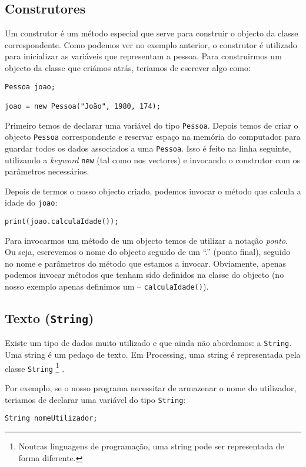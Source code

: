 \subsection{Construtores}
Um construtor é um método especial que serve para construir o objecto da classe correspondente. Como podemos ver no exemplo anterior, o construtor é utilizado para inicializar as variáveis que representam a pessoa.
Para construirmos um objecto da classe que criámos atrás, teriamos de escrever algo como:
\begin{lstlisting}
Pessoa joao;

joao = new Pessoa("João", 1980, 174);
\end{lstlisting}
Primeiro temos de declarar uma variável do tipo \texttt{Pessoa}. Depois temos de criar o objecto \texttt{Pessoa} correspondente e reservar espaço na memória do computador para guardar todos os dados associados a uma \texttt{Pessoa}. Isso é feito na linha seguinte, utilizando a \emph{keyword} \texttt{new} (tal como nos vectores) e invocando o construtor com os parâmetros necessários.

Depois de termos o nosso objecto criado, podemos invocar o método que calcula a idade do \texttt{joao}:
\begin{lstlisting}
print(joao.calculaIdade());
\end{lstlisting}

Para invocarmos um método de um objecto temos de utilizar a notação \emph{ponto}. Ou seja, escrevemos o nome do objecto seguido de um ``.'' (ponto final), seguido no nome e parâmetros do método que estamos a invocar.
Obviamente, apenas podemos invocar métodos que tenham sido definidos na classe do objecto (no nosso exemplo apenas definimos um -- \texttt{calculaIdade()}).


\subsection{Texto (\texttt{String})}
Existe um tipo de dados muito utilizado e que ainda não abordamos: a \texttt{String}. Uma string é um pedaço de texto. Em Processing, uma string é representada pela classe \texttt{String}%
\footnote{Noutras linguagens de programação, uma string pode ser representada de forma diferente.}
.

Por exemplo, se o nosso programa necessitar de armazenar o nome do utilizador, teriamos de declarar uma variável do tipo
\texttt{String}:
\begin{lstlisting}
String nomeUtilizador;
\end{lstlisting}

